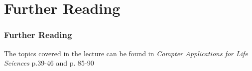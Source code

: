 \documentclass[12pt]{beamer}
\begin{document}
\section{Further Reading}
	\begin{frame}
		\frametitle{Further Reading}
		The topics covered in the lecture can be found in \textit{Compter Applications for Life Sciences} p.39-46 and p. 85-90
	\end{frame}
\end{document}
